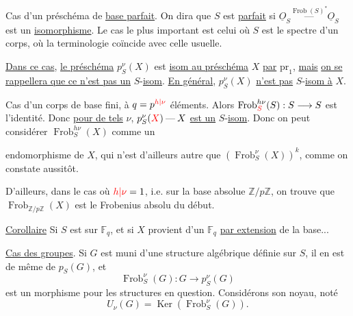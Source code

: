 Cas d'un préschéma de \uline{base parfait}.
On dira que $S$ est \uline{parfait} si 
$\underline O_S\mathbin{\overset{\operatorname{Frob}(S)^*}{\text{---}}}\underline O_S$
est un \uline{isomorphisme}.
Le cas le plus important est celui où $S$ est le spectre d'un corps, où
la terminologie coïncide avec celle usuelle.

\uline{Dans ce cas}, \uline{le préschéma} $p_S^\nu(X)$ est
\uline{isom au préschéma} $X$ \uline{par} $\mathrm{pr}_1$, \uline{mais}
\uline{on se rappellera que ce n'est pas un} $S$-\uline{isom}.
\uline{En général}, $p_S^\nu(X)$ \uline{n'est pas}
$S$-\uline{isom à} $X$.

Cas d'un corps de base fini, à $q=p^{{\color{red}h|\nu}}$ éléments.
\inserted{$[\deleted{\unsure{\nu=h\nu}}\unsure{\nu\mapsto h\nu}]$}
Alors $\operatorname{Frob}_{{\color{red}S}}^{h\nu}(S):S\longrightarrow S$
est l'identité. Donc \uline{pour de tels} $\nu$,
$p_S^\nu({\color{red}X})\mathbin{\text{---}}X$ \uline{est un} $S$-\uline{isom}.
Donc on peut considérer $\operatorname{Frob}_S^{h\nu}(X)$ comme un

endomorphisme de $X$, qui n'est d'ailleurs autre que
$(\operatorname{Frob}_S^\nu(X))^k$, comme on constate aussitôt.

D'ailleurs, dans le cas où ${\color{red}h|\nu}=1$, i.e.
sur la base absolue $\mathbb Z/p\mathbb Z$, on trouve que
$\operatorname{Frob}_{\mathbb Z/p\mathbb Z}(X)$ est le Frobenius absolu du début.

\uline{Corollaire} Si $S$ est sur $\mathbb F_q$, et si $X$ provient d'un
  $\mathbb F_q$ \uline{par extension} de la base...

\uline{Cas des groupes}. Si $G$ est muni d'une
structure algébrique définie sur $S$, il en est
de même de $p_S(G)$, et 
\[
\operatorname{Frob}_S^\nu(G):G\longrightarrow p_S^\nu(G)
\]
est un morphisme pour les structures en question.
Considérons son noyau, noté
\[
U_\nu(G)=\operatorname{Ker}(\operatorname{Frob}_S^\nu(G)).
\]

